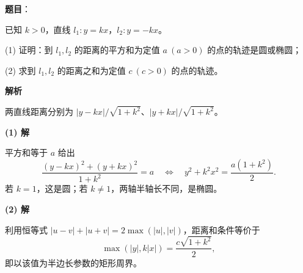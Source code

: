 \begin{answer}

\textbf{题目}：

已知 $k>0$，直线 $l_1:y=kx$，$l_2:y=-kx$。

(1) 证明：到 $l_1,l_2$ 的距离的平方和为定值 $a\ (a>0)$ 的点的轨迹是圆或椭圆；

(2) 求到 $l_1,l_2$ 的距离之和为定值 $c\ (c>0)$ 的点的轨迹。

\textbf{解析}

两直线距离分别为 $|y-kx|/\sqrt{1+k^2}$、$|y+kx|/\sqrt{1+k^2}$。

\textbf{(1) 解}

平方和等于 $a$ 给出
\nopagebreak[4]
\[
\frac{(y-kx)^2+(y+kx)^2}{1+k^2}=a
\quad\Longleftrightarrow\quad
y^2+k^2x^2=\frac{a(1+k^2)}2.
\]
若 $k=1$，这是圆；若 $k\ne1$，两轴半轴长不同，是椭圆。

\textbf{(2) 解}

利用恒等式 $|u-v|+|u+v|=2\max(|u|,|v|)$，距离和条件等价于
\nopagebreak[4]
\[
\max(|y|,k|x|)=\frac{c\sqrt{1+k^2}}2,
\]
即以该值为半边长参数的矩形周界。



\end{answer}
